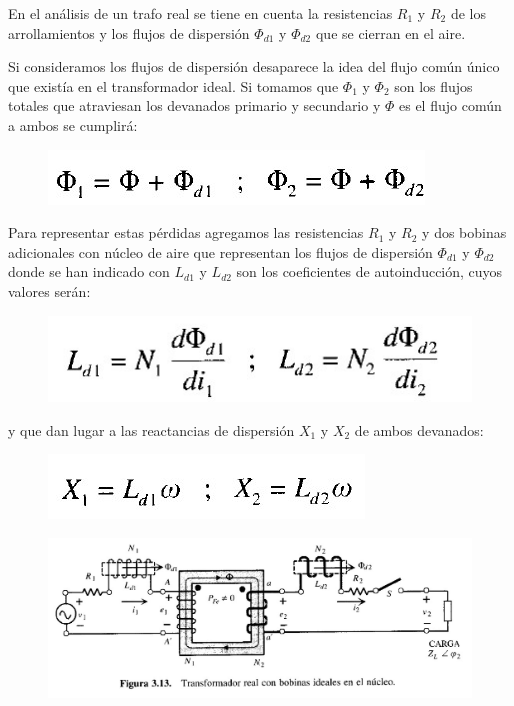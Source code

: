 En el análisis de un trafo real se tiene en cuenta la resistencias $R_{1}$ y $R_{2}$ de los arrollamientos y los flujos de dispersión $\Phi_{d1}$ y $\Phi_{d2}$ que se cierran en el aire.

Si consideramos los flujos de dispersión desaparece la idea del flujo común único que existía en el transformador ideal. Si tomamos que $\Phi_{1}$ y $\Phi_{2}$ son los flujos totales que atraviesan los devanados primario y secundario y $\Phi$ es el flujo común a ambos se cumplirá:

 \begin{figure}[H]
	\centering
	\includegraphics[width=0.3\linewidth]{"../Figuras/13"}
\end{figure} 

Para representar estas pérdidas agregamos las resistencias $R_{1}$ y $R_{2}$ y dos bobinas adicionales con núcleo de aire que representan los flujos de dispersión $\Phi_{d1}$ y $\Phi_{d2}$ donde se han indicado con $L_{d1}$ y $L_{d2}$ son los coeficientes de autoinducción, cuyos valores serán:

 \begin{figure}[H]
	\centering
	\includegraphics[width=0.3\linewidth]{"../Figuras/14"}
\end{figure} 

y que dan lugar a las reactancias de dispersión $X_{1}$ y $X_{2}$ de ambos devanados:
 \begin{figure}[H]
	\centering
	\includegraphics[width=0.3\linewidth]{"../Figuras/15"}
\end{figure} 

 \begin{figure}[H]
	\centering
	\includegraphics[width=0.8\linewidth]{"../Figuras/16"}
\end{figure} 

